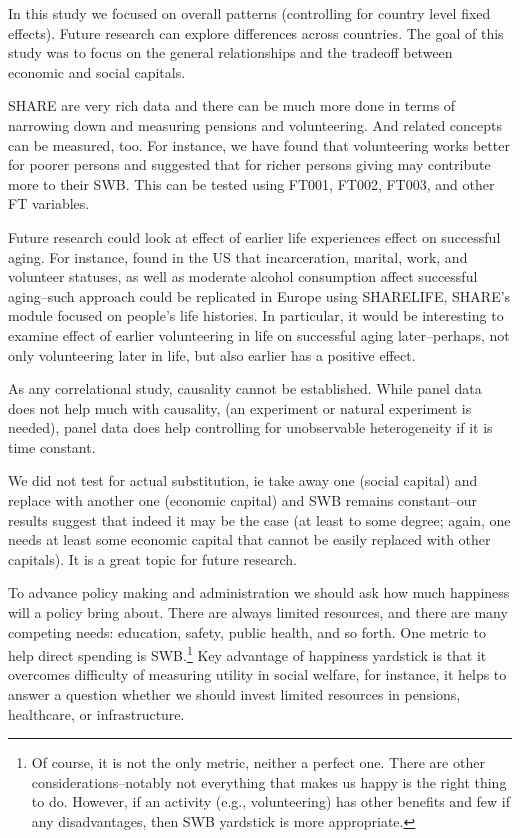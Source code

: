 \documentclass[10pt, letterpaper]{article}
\begin{document}
\begin{spacing}{1.4}
In this study we focused on overall patterns (controlling for country level fixed
effects). Future research can explore differences across countries. 
%
The goal of this study was to focus on the general relationships and the tradeoff
between economic and social capitals.

SHARE are very rich data and there can be much more done in terms of narrowing
down and measuring pensions and volunteering. And related concepts can be
measured, too. For instance, we have found that volunteering works better for
poorer persons and suggested that for richer persons giving may contribute more
to their SWB. This can be tested using FT001, FT002, FT003, and other FT
variables.  



Future research could look at effect of earlier life experiences effect on successful
aging. For instance, \citet{pruchno2010successful,pruchno2010two} found in the US that incarceration,
 marital, work, and volunteer statuses, as well as moderate
alcohol consumption affect successful aging--such approach could be
replicated in Europe using SHARELIFE, SHARE's module focused on people's life
histories. In particular, it would be interesting to examine effect of earlier
volunteering in life on successful aging later--perhaps, not only
volunteering later in life, but also earlier has a positive effect. 

As any correlational study, causality cannot be established. While panel data
does not help much with causality,  (an experiment or natural experiment is
needed), panel data does help controlling for unobservable heterogeneity if it is
time constant. 

We did not test for actual substitution, ie take away one (social  capital) and replace
with another one (economic capital) and SWB remains constant--our results
suggest that indeed it may be the case (at least to some degree; again, one
needs at least some economic capital that cannot be easily replaced with other
capitals). It is a great topic for future research.

To advance policy making and
administration we should ask how much happiness will a policy bring
about. There are always limited resources, and there are many competing needs: education, safety, public
health, and so forth. One metric to help direct spending is SWB.\footnote{Of
  course, it is not the only metric, neither a perfect one. There are other
  considerations--notably not everything that makes us happy is the right thing
  to do. However, if an activity (e.g., volunteering) has other benefits and few if any
  disadvantages, then SWB yardstick is more appropriate.}
Key  advantage of happiness yardstick is that it overcomes difficulty
of measuring utility in social welfare, for instance, it helps to answer
a question whether we should  invest
limited resources in pensions, healthcare, or infrastructure.


\end{spacing}
\end{document}
